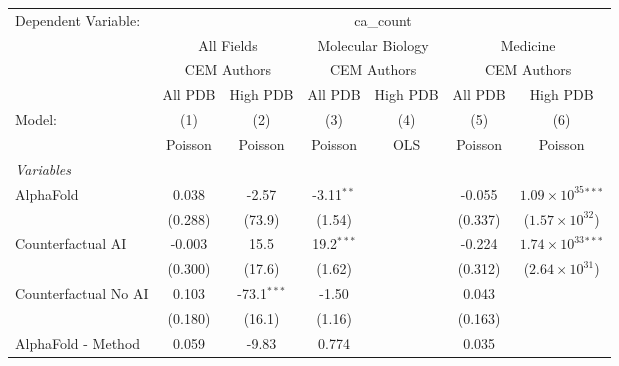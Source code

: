 \begingroup
\centering
\begin{tabular}{lcccccc}
   \tabularnewline \midrule \midrule
   Dependent Variable: & \multicolumn{6}{c}{ca\_count}\\
 & \multicolumn{2}{c}{All Fields} & \multicolumn{2}{c}{Molecular Biology} & \multicolumn{2}{c}{Medicine} \\
\cmidrule(lr){2-3} \cmidrule(lr){4-5} \cmidrule(lr){6-7}
 & \multicolumn{2}{c}{CEM Authors} & \multicolumn{2}{c}{CEM Authors} & \multicolumn{2}{c}{CEM Authors} \\
\cmidrule(lr){2-3} \cmidrule(lr){4-5} \cmidrule(lr){6-7}
 & \multicolumn{1}{c}{All PDB} & \multicolumn{1}{c}{High PDB} & \multicolumn{1}{c}{All PDB} & \multicolumn{1}{c}{High PDB} & \multicolumn{1}{c}{All PDB} & \multicolumn{1}{c}{High PDB} \\
\cmidrule(lr){2-2} \cmidrule(lr){3-3} \cmidrule(lr){4-4} \cmidrule(lr){5-5} \cmidrule(lr){6-6} \cmidrule(lr){7-7}
   Model:                                                     & (1)      & (2)           & (3)          & (4)  & (5)          & (6)\\  
                                                              &  Poisson & Poisson       & Poisson      & OLS  & Poisson      & Poisson\\  
   \midrule
   \emph{Variables}\\
   AlphaFold                                                  & 0.038    & -2.57         & -3.11$^{**}$ &      & -0.055       & $1.09\times 10^{35}$$^{***}$\\    
                                                              & (0.288)  & (73.9)        & (1.54)       &      & (0.337)      & ($1.57\times 10^{32}$)\\    
   Counterfactual AI                                          & -0.003   & 15.5          & 19.2$^{***}$ &      & -0.224       & $1.74\times 10^{33}$$^{***}$\\    
                                                              & (0.300)  & (17.6)        & (1.62)       &      & (0.312)      & ($2.64\times 10^{31}$)\\    
   Counterfactual No AI                                       & 0.103    & -73.1$^{***}$ & -1.50        &      & 0.043        &   \\   
                                                              & (0.180)  & (16.1)        & (1.16)       &      & (0.163)      &   \\   
   AlphaFold - Method                                         & 0.059    & -9.83         & 0.774        &      & 0.035        &   \\   

\end{tabular}
